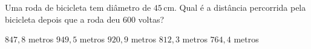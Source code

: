 \noindent\parbox{\linewidth}{

Uma roda de bicicleta tem diâmetro de $45$\,cm. Qual é a distância percorrida pela bicicleta depois que a roda deu $600$ voltas?

$     847{,}8$ metros
$949{,}5$ metros
$920{,}9$ metros
$812{,}3$ metros
$764{,}4$ metros



}


